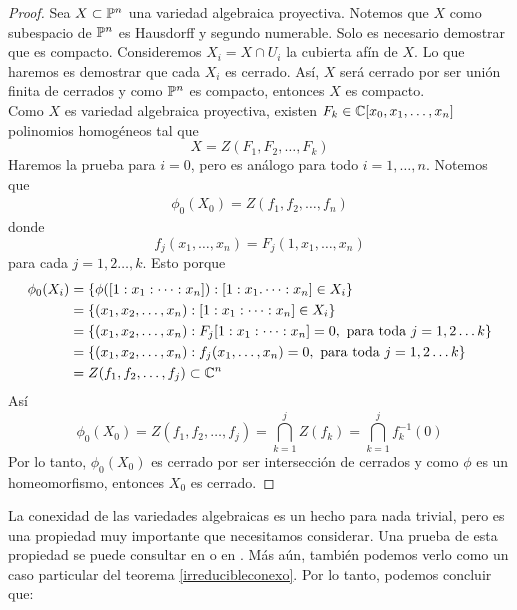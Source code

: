 \begin{proof}
	Sea $X\subset \mathbb{P}^n$ una variedad algebraica proyectiva. Notemos que $X$ como subespacio de $\mathbb{P}^n$ es Hausdorff y segundo numerable. Solo es necesario demostrar que es compacto. Consideremos $X_i=X\cap U_i$ la cubierta afín de $X$. Lo que haremos es demostrar que cada $X_i$ es cerrado. Así, $X$ será cerrado por ser unión finita de cerrados y como $\mathbb{P}^n$ es compacto, entonces $X$ es compacto.\\
	Como $X$ es variedad algebraica proyectiva, existen $F_k\in\mathbb{C}[x_0,x_1,\dots,x_n]$ polinomios homogéneos tal que
	\begin{equation*}
		X=Z(F_1,F_2,\dots, F_k)        
	\end{equation*}
	Haremos la prueba para $i=0$, pero es análogo para todo $i=1,\dots, n$.
	Notemos que
	\begin{align*}
		\phi_0(X_0)=Z(f_1,f_2,\dots, f_n)
	\end{align*}
	donde 
	\begin{equation*}
		f_j(x_1,\dots,x_n)=F_j\left(1,x_1,\dots,x_n\right)
	\end{equation*}
	para cada $j=1,2\dots,k$. Esto porque
	\begin{align*}
		\phi_0(X_i)&=\{\phi([1:x_1:\dots:x_n]):[1:x_1.\dots:x_n]\in X_i\}\\
		&=\{(x_1,x_2,\dots,x_n):[1:x_1:\dots:x_n]\in X_i\}\\
		&=\{(x_1,x_2,\dots,x_n):F_j[1:x_1:\dots:x_n]=0, \text{ para toda } j=1,2\dots k\}\\
		&=\{(x_1,x_2,\dots,x_n):f_j(x_1,\dots,x_n)=0, \text{ para toda } j=1,2\dots k\}\\
		&=Z(f_1,f_2,\dots,f_j)\subset \mathbb{C}^n
	\end{align*}
	Así
	\begin{equation*}
		\phi_0(X_0)=Z(f_1,f_2,\dots,f_j)=\bigcap_{k=1}^jZ(f_k)=\bigcap_{k=1}^jf_k^{-1}(0)
	\end{equation*}
	Por lo tanto, $\phi_0(X_0)$ es cerrado por ser intersección de cerrados y como $\phi$ es un homeomorfismo, entonces $X_0$ es cerrado.
\end{proof}

La conexidad de las variedades algebraicas es un hecho para nada trivial, pero es una propiedad muy importante que necesitamos considerar. Una prueba de esta propiedad se puede consultar en \parencite[Cap. 4 Sec. 4.2]{carlosga} o en \parencite[Cap. VII Sec. 2]{shafarevich2016basic}. Más aún, también podemos verlo como un caso particular del teorema \ref{irreducibleconexo}. Por lo tanto, podemos concluir que:


